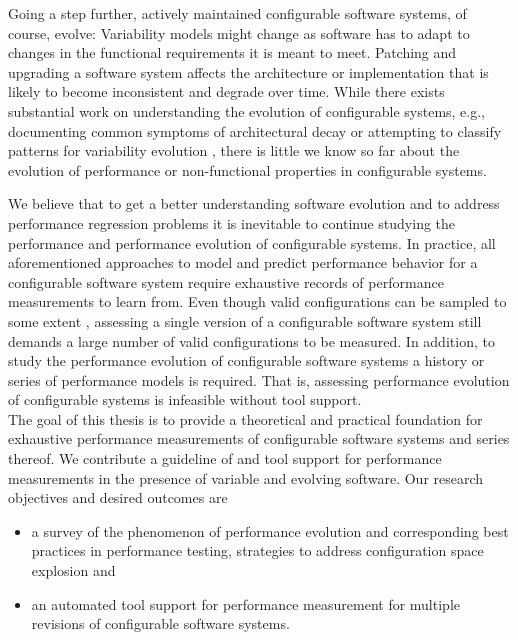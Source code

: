 Going a step further, actively maintained configurable software systems, of
course, evolve: Variability models might change as software has to adapt to
changes in the functional requirements it is meant to meet. Patching and
upgrading a software system affects the architecture or implementation that is
likely to become inconsistent and degrade over time. While there exists
substantial work on understanding the evolution of configurable systems, e.g.,
documenting common symptoms of architectural decay \citep{passos_feature_2015,zhang_variability_2013} or
attempting to classify patterns for variability evolution
\citep{seidl_co-evolution_2012,peng_analyzing_2011,passos_towards_2012}, there
is little we know so far about the evolution of performance or non-functional
properties in configurable systems.

We believe that to get a better understanding software evolution and to address
performance regression problems it is inevitable to continue studying the
performance and performance evolution of configurable systems. In practice, all
aforementioned approaches to model and predict performance behavior for a
configurable software system require exhaustive records of performance
measurements to learn from. Even though valid configurations can be sampled to
some extent \citep{apel_feature-oriented_2013}, assessing a single version of a configurable software
system still demands a large number of valid configurations to be measured. In
addition, to study the performance evolution of configurable software systems a
history or series of performance models is required. That is, assessing
performance evolution of configurable systems is infeasible without tool
support.\\

The goal of this thesis is to provide a theoretical and practical foundation for
exhaustive performance measurements of configurable software systems and series
thereof. We contribute a guideline of and tool support for performance
measurements in the presence of variable and evolving software. Our research
objectives and desired outcomes are

\begin{itemize}
  \item a survey of the phenomenon of performance evolution and corresponding
  best practices in performance testing, strategies to address configuration space explosion and 
  \item an automated tool support for performance measurement for multiple
  revisions of configurable software systems.
\end{itemize}

